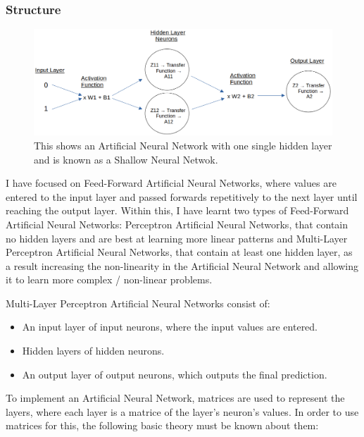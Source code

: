\documentclass[./project-report/src/latex/project-report.tex]{subfiles}
\begin{document}
\subsubsection{Structure}

\begin{figure}[h!]
\centering
\includegraphics[width=1\textwidth]{./project-report/src/images/shallow-ann-diagram.png}
\caption{This shows an Artificial Neural Network with one single hidden layer and is known as a Shallow Neural Netwok.}
\end{figure}

I have focused on Feed-Forward Artificial Neural Networks, where values are entered to the input layer and passed forwards repetitively to the next layer until 
reaching the output layer. Within this, I have learnt two types of Feed-Forward Artificial Neural Networks: Perceptron Artificial Neural Networks, that contain no 
hidden layers and are best at learning more linear patterns and Multi-Layer Perceptron Artificial Neural Networks, that contain at least one hidden layer, as a result 
increasing the non-linearity in the Artificial Neural Network and allowing it to learn more complex / non-linear problems.
\vspace{5mm}

Multi-Layer Perceptron Artificial Neural Networks consist of:

\begin{itemize}
    \item An input layer of input neurons, where the input values are entered.
    \item Hidden layers of hidden neurons.
    \item An output layer of output neurons, which outputs the final prediction.
\end{itemize}

To implement an Artificial Neural Network, matrices are used to represent the layers, where each layer is a matrice of the layer's neuron's values. In 
order to use matrices for this, the following basic theory must be known about them:
\end{document}
